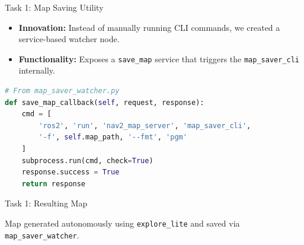 \begin{frame}[fragile]{Task 1: Map Saving Utility}
    \begin{itemize}
        \item \textbf{Innovation:} Instead of manually running CLI commands, we created a service-based watcher node.
        \item \textbf{Functionality:} Exposes a \texttt{save\_map} service that triggers the \texttt{map\_saver\_cli} internally.
    \end{itemize}
    \begin{lstlisting}[language=Python]
# From map_saver_watcher.py
def save_map_callback(self, request, response):
    cmd = [
        'ros2', 'run', 'nav2_map_server', 'map_saver_cli',
        '-f', self.map_path, '--fmt', 'pgm'
    ]
    subprocess.run(cmd, check=True)
    response.success = True
    return response
    \end{lstlisting}
\end{frame}

\begin{frame}{Task 1: Resulting Map}
    \begin{center}
    \end{center}
    \footnotesize{Map generated autonomously using \texttt{explore\_lite} and saved via \texttt{map\_saver\_watcher}.}
\end{frame}